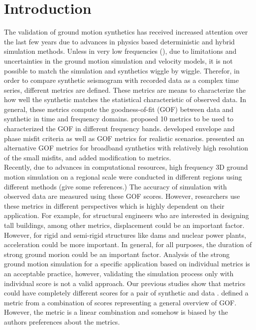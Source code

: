 
\section{Introduction}

The validation of ground motion synthetics has received increased attention over the last few years due to advances in physics based deterministic and hybrid simulation methods. Unless in very low frequencies (), due to limitations and uncertainties in the ground motion simulation and velocity models, it is not possible to match the simulation and synthetics wiggle by wiggle. Therefor, in order to compare synthetic seismogram with recorded data as a complex time series, different metrics are defined. These metrics are means to characterize the how well the synthetic matches the statistical characteristic of observed data. In general, these metrics compute the goodness-of-fit (GOF) between data and synthetic in time and frequency domains. \citet{Anderson_2004_Proc} proposed 10 metrics to be used to characterized the GOF in different frequency bands. \citet{Kristekova_2006_BSSA,Kristekova_2009_GJI} developed envelope and phase misfit criteria as well as GOF metrics for realistic scenarios. \citet{Olsen_2010_SRL} presented an alternative GOF metrics for broadband synthetics with relatively high resolution of the small misfits, and \citet{Taborda_2013_BSSA} added modification to \citet{Anderson_2004_Proc} metrics.\\
Recently, due to advances in computational resources, high frequency 3D ground motion simulation on a regional scale were conducted in different regions using different methods (give some references.) The accuracy of simulation with observed data are measured using these GOF scores. However, researchers use these metrics in different perspectives which is highly dependent on their application. For example, for structural engineers who are interested in designing tall buildings, among other metrics, displacement could be an important factor. However, for rigid and semi-rigid structures like dams and nuclear power plants, acceleration could be more important. In general, for all purposes, the duration of strong ground morion could be an important factor. Analysis of the strong ground motion simulation for a specific application based on individual metrics is an acceptable practice, however, validating the simulation process only with individual score is not a valid approach. Our previous studies show that metrics could have completely different scores for a pair of synthetic and data \citep[e.g.,][]{Taborda_2016_GJI}. \citet{Taborda_2013_BSSA} defined a metric from a combination of  \citet{Anderson_2004_Proc} scores representing a general overview of GOF. However, the metric is a linear combination and somehow is biased by the authors preferences about the metrics. \\
